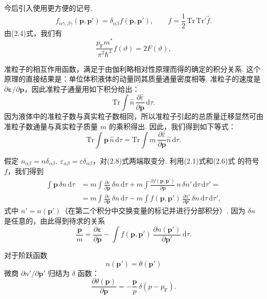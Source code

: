 今后引入使用更方便的记号.
\begin{equation}
f_{\alpha\gamma,\beta\gamma}(\bm p,\bm p')=\delta_{\alpha\beta}f(\bm p,\bm p'),\qquad f=\frac{1}{2}\,\mathrm{Tr}\,\mathrm{Tr}'\hat f.
\end{equation}
由(2.4)式，我们有
\begin{equation}
\frac{p_{\mathrm F}m^{*}}{\pi^{2}\hbar^{3}}f(\vartheta)=2F(\vartheta),
\end{equation}

准粒子的相互作用函数，满足于由伽利略相对性原理而得的确定的积分关系. 这个原理的直接结果是：单位体积液体的动量同其质量通量密度相等. 准粒子的速度是 $\partial\bm\varepsilon/\partial\bm p$，因此准粒子通量用如下积分给出：
\begin{equation*}
\mathrm{Tr}\int\hat n\,\frac{\partial\hat\varepsilon}{\partial\bm p}\,\mathrm{d}\tau.
\end{equation*}
因为液体中的准粒子数与真实粒子数相同，所以准粒子引起的总质量迁移显然可由准粒子数通量与真实粒子质量 $m$ 的乘积得出. 因此，我们得到如下等式：
\begin{equation}
\mathrm{Tr}\int\bm p\,\hat n\,\mathrm{d}\tau=\mathrm{Tr}\int m\,\frac{\partial\hat\varepsilon}{\partial\bm p}\hat n\,\mathrm{d}\tau.
\end{equation}

假定 $n_{\alpha\beta}=n\delta_{\alpha\beta},\ \varepsilon_{\alpha\beta}=\varepsilon\delta_{\alpha\beta}$，对(2.8)式两端取变分. 利用(2.1)式和(2.6)式
的符号 $f$，我们得到
\begin{equation*}
\begin{aligned}
\int\bm p\,\delta n\,\mathrm{d}\tau
&=m\int\frac{\partial\varepsilon}{\partial\bm p}\,\delta n\,\mathrm{d}\tau
+m\int\frac{\partial f(\bm p,\bm p')}{\partial\bm p}\,n\,\delta n'\,\mathrm{d}\tau\,\mathrm{d}\tau'=\\
&=m\int\frac{\partial\varepsilon}{\partial\bm p}\,\delta n\,\mathrm{d}\tau
-m\int f(\bm p,\bm p')\,\frac{\partial n'}{\partial\bm p'}\,\delta n\,\mathrm{d}\tau\,\mathrm{d}\tau',
\end{aligned}
\end{equation*}
式中 $n'=n(\bm p')$（在第二个积分中交换变量的标记并进行分部积分）. 因为 $\delta n$ 是任意的，由此得到待求的关系
\begin{equation}
\frac{\bm p}{m}=\frac{\partial\bm\varepsilon}{\partial\bm p}-\int f(\bm p,\bm p')\,\frac{\partial n(\bm p')}{\partial\bm p'}\,\mathrm{d}\tau.
\end{equation}

对于阶跃函数
\begin{equation*}
n(\bm p')=\theta(\bm p')
\end{equation*}
微商 $\partial n'/\partial\bm p'$ 归结为 $\delta$ 函数：
\begin{equation}
\frac{\partial\theta(\bm p)}{\partial\bm p}=-\frac{\bm p}{p}\,\delta(p-p_{\mathrm F}).
\end{equation}

